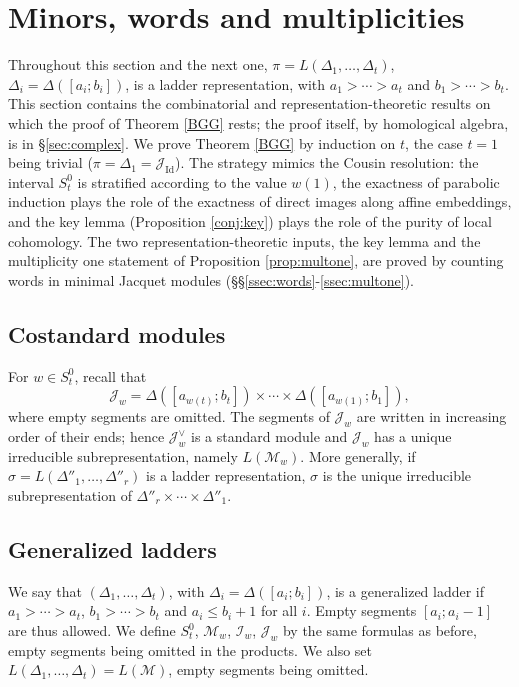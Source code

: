 \documentclass[a4paper,12pt,leqno]{amsart}
\newcommand{\caI}{\mathcal{I}}
\newcommand{\caJ}{\mathcal{J}}
\newcommand{\caM}{\mathcal{M}}
\theoremstyle{plain}
\theoremstyle{definition}
\theoremstyle{definition}
\newcommand{\Id}{\mathrm{Id}}
\begin{document}
\section{Minors, words and multiplicities}\label{sec:reduction}

Throughout this section and the next one, $\pi=L(\Delta_1,\ldots,\Delta_t)$,
$\Delta_i=\Delta([a_i;b_i])$, is a ladder representation, with $a_1>\cdots>a_t$ and $b_1>\cdots>b_t$.
This section contains the combinatorial and representation-theoretic results on which the proof of
Theorem \ref{BGG} rests; the proof itself, by homological algebra, is in \S\ref{sec:complex}. We prove
Theorem \ref{BGG} by induction on $t$, the case
 $t=1$ being trivial ($\pi=\Delta_1=\caJ_{\Id}$). The strategy mimics the Cousin resolution: the
 interval $S_t^0$
 is stratified according to the value $w(1)$, the exactness of parabolic induction plays the role
 of the exactness
  of direct images along affine embeddings, and the key lemma (Proposition \ref{conj:key}) plays the role
  of the purity of local cohomology. The two representation-theoretic inputs, the key lemma and the
  multiplicity one statement of Proposition \ref{prop:multone}, are proved by counting words in
  minimal Jacquet modules (\S\S\ref{ssec:words}-\ref{ssec:multone}).

\subsection{Costandard modules}
For $w\in S_t^0$, recall that
\[\caJ_w=\Delta([a_{w(t)};b_t])\times\cdots\times\Delta([a_{w(1)};b_1]),\]
where empty segments are omitted. The segments of $\caJ_w$ are written in increasing order
of their ends; hence $\caJ_w^\vee$ is a standard module and $\caJ_w$ has a unique irreducible
subrepresentation,
namely $L(\caM_w)$. More generally, if $\sigma=L(\Delta''_1,\ldots,\Delta''_r)$ is a ladder
representation, $\sigma$
is the unique irreducible subrepresentation of $\Delta''_r\times\cdots\times\Delta''_1$.

\subsection{Generalized ladders}\label{ssec:generalized}
We say that $(\Delta_1,\ldots,\Delta_t)$, with $\Delta_i=\Delta([a_i;b_i])$, is a generalized ladder
if $a_1>\cdots>a_t$, $b_1>\cdots>b_t$ and $a_i\leq b_i+1$ for all $i$. Empty segments $[a_i;a_i-1]$
 are thus allowed. We define $S_t^0$, $\caM_w$, $\caI_w$, $\caJ_w$ by the same formulas as before,
 empty segments being omitted in the products. We also set $L(\Delta_1,\ldots,\Delta_t)=L(\caM)$,
 empty segments being omitted.
\end{document}
